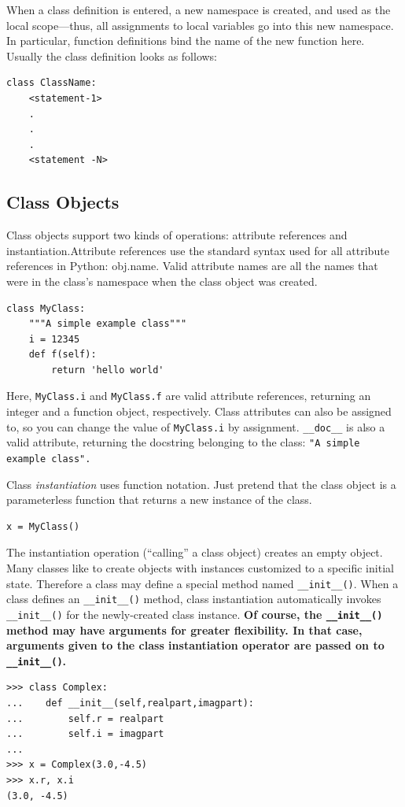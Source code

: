 \documentclass[12pt,a4paper]{article}
\begin{document}
When a class definition is entered, a new namespace is created, and used as the local scope—thus, all assignments to local variables go into this new namespace. In particular, function definitions bind the name of the new function here. Usually the class definition looks as follows:
\begin{verbatim}
class ClassName:
    <statement-1>
    .
    .
    .
    <statement -N>
\end{verbatim}
\subsection{Class Objects}
Class objects support two kinds of operations: attribute references and instantiation.Attribute references use the standard syntax used for all attribute references in Python: obj.name. Valid attribute names are all the names that were in the class’s namespace when the class object was created.

\begin{verbatim}
class MyClass:
    """A simple example class"""
    i = 12345
    def f(self):
        return 'hello world'
\end{verbatim}
Here, \texttt{MyClass.i} and \texttt{MyClass.f} are valid attribute references, returning an integer and a function object, respectively. Class attributes can also be assigned to, so you can change the value of \texttt{MyClass.i} by assignment. \texttt{\_\_doc\_\_} is also a valid attribute, returning the docstring belonging to the class: \texttt{"A simple example class".}

Class \textit{instantiation} uses function notation. Just pretend that the class object is a parameterless function that returns a new instance of the class.

\begin{verbatim}
x = MyClass()
\end{verbatim}

The instantiation operation (“calling” a class object) creates an empty object. Many classes like to create objects with instances customized to a specific initial state. Therefore a class may define a special method named \texttt{\_\_init\_\_()}. When a class defines an \texttt{\_\_init\_\_()} method, class instantiation automatically invokes \texttt{\_\_init\_\_()} for the newly-created class instance. \textbf{Of course, the \texttt{\_\_init\_\_()} method may have arguments for greater flexibility. In that case, arguments given to the class instantiation operator are passed on to \texttt{\_\_init\_\_()}.}
\begin{verbatim}
>>> class Complex:
...    def __init__(self,realpart,imagpart):
...        self.r = realpart
...        self.i = imagpart
...
>>> x = Complex(3.0,-4.5)
>>> x.r, x.i
(3.0, -4.5)
\end{verbatim}
\end{document}

